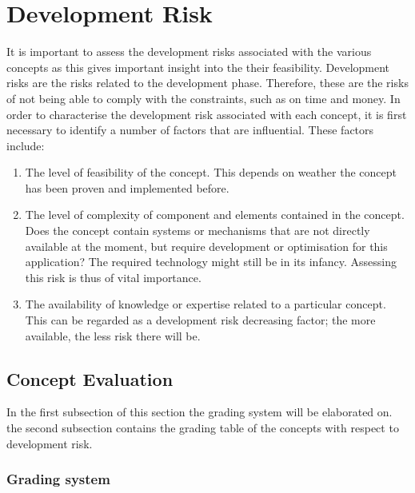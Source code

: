 \chapter{Development Risk}
\label{ch:deve_risk}

It is important to assess the development risks associated with the various concepts as this gives important insight into the their feasibility. Development risks are the risks related to the development phase. Therefore, these are the risks of not being able to comply with the constraints, such as on time and money. In order to characterise the development risk associated with each concept, it is first necessary to identify a number of factors that are influential. These factors include:

\begin{enumerate}
    \item The level of feasibility of the concept. This depends on weather the concept has been proven and implemented before. 

    \item The level of complexity of component and elements contained in the concept. Does the concept contain systems or mechanisms that are not directly available at the moment, but require development or optimisation for this application? The required technology might still be in its infancy. Assessing this risk is thus of vital importance.
  
    \item The availability of knowledge or expertise related to a particular concept. This can be regarded as a development risk decreasing factor; the more available, the less risk there will be.
    
\end{enumerate}

\section{Concept Evaluation}

In the first subsection of this section the grading system will be elaborated on. the second subsection contains the grading table of the concepts with respect to development risk.

\subsection{Grading system} %

